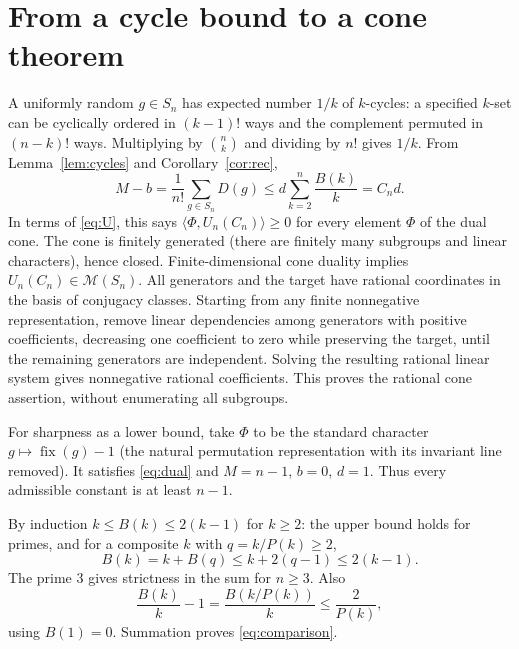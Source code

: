 \documentclass[11pt]{article}
\theoremstyle{remark}
\newcommand{\Cone}{\mathcal{M}}
\newcommand{\fix}{\operatorname{fix}}
\begin{document}
\section{From a cycle bound to a cone theorem}
A uniformly random $g\in S_n$ has expected number $1/k$ of $k$-cycles: a specified $k$-set can be cyclically ordered in $(k-1)!$ ways and the complement permuted in $(n-k)!$ ways. Multiplying by $\binom nk$ and dividing by $n!$ gives $1/k$. From Lemma~\ref{lem:cycles} and Corollary~\ref{cor:rec},
\begin{equation}\label{eq:average}
 M-b=\frac1{n!}\sum_{g\in S_n}D(g)
 \le d\sum_{k=2}^n\frac{B(k)}k=C_nd.
\end{equation}
In terms of \eqref{eq:U}, this says $\langle\Phi,U_n(C_n)\rangle\ge0$ for every element $\Phi$ of the dual cone. The cone is finitely generated (there are finitely many subgroups and linear characters), hence closed. Finite-dimensional cone duality implies $U_n(C_n)\in\Cone(S_n)$. All generators and the target have rational coordinates in the basis of conjugacy classes. Starting from any finite nonnegative representation, remove linear dependencies among generators with positive coefficients, decreasing one coefficient to zero while preserving the target, until the remaining generators are independent. Solving the resulting rational linear system gives nonnegative rational coefficients. This proves the rational cone assertion, without enumerating all subgroups.

For sharpness as a lower bound, take $\Phi$ to be the standard character $g\mapsto\fix(g)-1$ (the natural permutation representation with its invariant line removed). It satisfies \eqref{eq:dual} and $M=n-1$, $b=0$, $d=1$. Thus every admissible constant is at least $n-1$.

By induction $k\le B(k)\le2(k-1)$ for $k\ge2$: the upper bound holds for primes, and for a composite $k$ with $q=k/P(k)\ge2$,
\[ B(k)=k+B(q)\le k+2(q-1)\le2(k-1). \]
The prime $3$ gives strictness in the sum for $n\ge3$. Also
\[
 \frac{B(k)}k-1=\frac{B(k/P(k))}k\le\frac2{P(k)},
\]
using $B(1)=0$. Summation proves \eqref{eq:comparison}.
\end{document}
